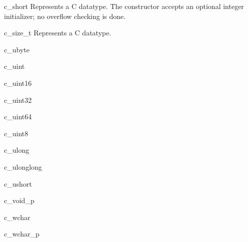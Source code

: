 \begin{classdesc}{c_short}{}
Represents a C  datatype.  The constructor accepts
an optional integer initializer; no overflow checking is done.
\end{classdesc}

\begin{classdesc}{c_size_t}{}
Represents a C  datatype.
\end{classdesc}

\begin{classdesc}{c_ubyte}{}
\end{classdesc}

\begin{classdesc}{c_uint}{}
\end{classdesc}

\begin{classdesc}{c_uint16}{}
\end{classdesc}

\begin{classdesc}{c_uint32}{}
\end{classdesc}

\begin{classdesc}{c_uint64}{}
\end{classdesc}

\begin{classdesc}{c_uint8}{}
\end{classdesc}

\begin{classdesc}{c_ulong}{}
\end{classdesc}

\begin{classdesc}{c_ulonglong}{}
\end{classdesc}

\begin{classdesc}{c_ushort}{}
\end{classdesc}

\begin{classdesc}{c_void_p}{}
\end{classdesc}

\begin{classdesc}{c_wchar}{}
\end{classdesc}

\begin{classdesc}{c_wchar_p}{}
\end{classdesc}

